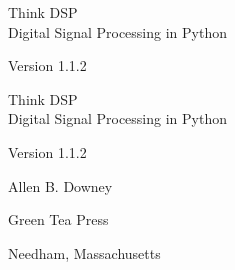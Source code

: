 \documentclass[12pt]{book}
\newcommand{\thetitle}{Think DSP}
\newcommand{\thesubtitle}{Digital Signal Processing in Python}
\newcommand{\theversion}{1.1.2}
\begin{document}
\begin{latexonly}

\renewcommand{\topfraction}{0.9}
\renewcommand{\blankpage}{\thispagestyle{empty} \quad \newpage}


\thispagestyle{empty}

\begin{flushright}
\vspace*{2.0in}

\begin{spacing}{3}
{\huge \thetitle}\\
{\Large \thesubtitle}
\end{spacing}

\vspace{0.25in}

Version \theversion

\vfill

\end{flushright}


\blankpage
\blankpage

\pagebreak
\thispagestyle{empty}

\begin{flushright}
\vspace*{2.0in}

\begin{spacing}{3}
{\huge \thetitle}\\
{\Large \thesubtitle}
\end{spacing}

\vspace{0.25in}

Version \theversion

\vspace{1in}


{\Large
Allen B. Downey\\
}


\vspace{0.5in}

{\Large Green Tea Press}

{\small Needham, Massachusetts}

\vfill

\end{flushright}


\pagebreak
\thispagestyle{empty}


\end{latexonly}
\end{document}
